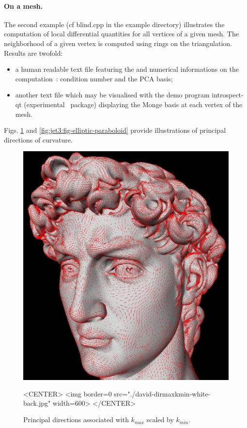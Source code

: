 \paragraph{On a mesh.}
The second example (cf blind.cpp in the example directory) illustrates
the computation of local differential quantities for all vertices of a
given mesh. The neighborhood of a given vertex is computed using rings on
the triangulation. Results are twofold:
\begin{itemize}
\item
a human readable text file featuring the  and
numerical informations on the computation~: condition number and the
PCA basis;
\item another text file which may be visualised with the demo program
  introspect-qt (experimental \cgal\ package) displaying the Monge
  basis at each vertex of the mesh.
\end{itemize}



Figs.
\ref{fig:jet3:fig-david} and
\ref{fig:jet3:fig-elliptic-paraboloid}
provide illustrations of principal directions of curvature.

\begin{figure}[!ht]
\begin{ccTexOnly}
\centerline{
\includegraphics[width=.5\linewidth]{Jet_fitting_3/david-dirmaxkmin-jpg-white-back}}
\end{ccTexOnly}
\caption{Principal directions associated with $k_{max}$ scaled by $k_{min}$.}

\begin{ccHtmlOnly}
<CENTER> <img border=0 src="./david-dirmaxkmin-white-back.jpg" width=600>
</CENTER>
\end{ccHtmlOnly}
\label{fig:jet3:fig-david}
\end{figure}

